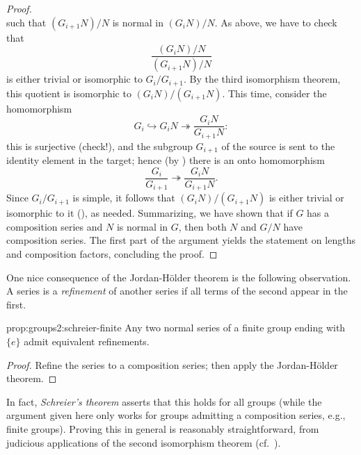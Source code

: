 \begin{proof}
\[  \]
  such that $(G_{i+1}N)/N$ is normal in $(G_i N)/N$. As above, we have
  to check that
  \[
    \frac{(G_i N)/N}{(G_{i+1} N)/N}
  \]
  is either trivial or isomorphic to $G_i/G_{i+1}$. By the third
  isomorphism theorem, this quotient is isomorphic to
  $(G_i N)/(G_{i+1} N)$. This time, consider the homomorphism
  \[
    G_i \hookrightarrow G_i N \twoheadrightarrow \frac{G_i N}{G_{i+1}
      N}:
  \]
  this is surjective (check!), and the subgroup $G_{i+1}$ of the
  source is sent to the identity element in the target; hence (by
  ) there is an onto
  homomorphism
  \[
    \frac{G_i}{G_{i+1}} \twoheadrightarrow \frac{G_i N}{G_{i+1} N}.
  \]
  Since $G_i/G_{i+1}$ is simple, it follows that $(G_i N)/(G_{i+1} N)$
  is either trivial or isomorphic to it
  (), as
  needed.  Summarizing, we have shown that if $G$ has a composition
  series and $N$ is normal in $G$, then both $N$ and $G/N$ have
  composition series. The first part of the argument yields the
  statement on lengths and composition factors, concluding the proof.
\end{proof}
One nice consequence of the Jordan-H\"older theorem is the following
observation. A series is a \emph{refinement} of another series if all
terms of the second appear in the first.

\begin{prop}{}{prop:groups2:schreier-finite}
  Any two normal series of a finite group ending with $\{e\}$ admit
  equivalent refinements.
\end{prop}

\begin{proof}
  Refine the series to a composition series; then apply the
  Jordan-H\"older theorem.
\end{proof}
In fact, \emph{Schreier's theorem} asserts that this holds for all
groups (while the argument given here only works for groups admitting
a composition series, e.g., finite groups). Proving this in general is
reasonably straightforward, from judicious applications of the second
isomorphism theorem (cf.\
).

